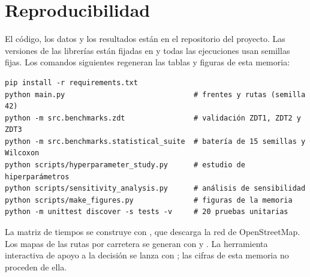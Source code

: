 \section{Reproducibilidad}
\label{sec:reproducibilidad}

El código, los datos y los resultados están en el repositorio del proyecto. Las versiones de las librerías están fijadas en  y todas las ejecuciones usan semillas fijas. Los comandos siguientes regeneran las tablas y figuras de esta memoria:

\begin{small}
\begin{verbatim}
pip install -r requirements.txt
python main.py                              # frentes y rutas (semilla 42)
python -m src.benchmarks.zdt                # validación ZDT1, ZDT2 y ZDT3
python -m src.benchmarks.statistical_suite  # batería de 15 semillas y Wilcoxon
python scripts/hyperparameter_study.py      # estudio de hiperparámetros
python scripts/sensitivity_analysis.py      # análisis de sensibilidad
python scripts/make_figures.py              # figuras de la memoria
python -m unittest discover -s tests -v     # 20 pruebas unitarias
\end{verbatim}
\end{small}

La matriz de tiempos se construye con , que descarga la red de OpenStreetMap. Los mapas de las rutas por carretera se generan con  y . La herramienta interactiva de apoyo a la decisión se lanza con ; las cifras de esta memoria no proceden de ella.
